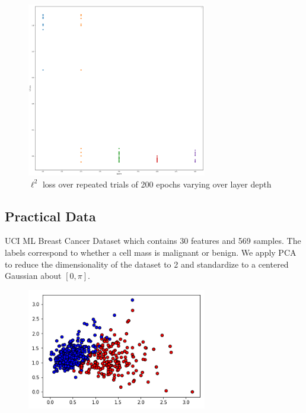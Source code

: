 \documentclass{beamer}
\newcommand\0{\mathbf{0}}
\newcommand\<{\langle}
\renewcommand\>{\rangle}
\begin{document}
\begin{frame}
\begin{figure}[H]
\centering
\includegraphics[width=0.7\textwidth]{images/costs_layer_sep.png}	
\caption{$\ell^2$ loss over repeated trials of 200 epochs varying over layer depth}
\end{figure}
\end{frame}

\subsection{Practical Data}

\begin{frame}
UCI ML Breast Cancer Dataset which contains 30 features and 569 samples. The labels correspond to whether a cell mass is malignant or benign. We apply PCA to reduce the dimensionality of the dataset to 2 and standardize to a centered Gaussian about $[0, \pi]$.

\begin{figure}[H]
\centering
\includegraphics[width=0.7\textwidth]{images/breast_cancer_data}	
\end{figure}
\end{frame}
\end{document}
